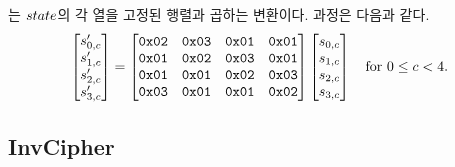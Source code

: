 \documentclass{article}
\begin{document}
\mc 는 $state$의 각 열을 고정된 행렬과 곱하는 변환이다. 과정은 다음과 같다.
$$
    \begin{bmatrix}
        s'_{0,c} \\
        s'_{1,c} \\
        s'_{2,c} \\
        s'_{3,c}
    \end{bmatrix}
     = \begin{bmatrix}
        \texttt{0x02} & \texttt{0x03} & \texttt{0x01} & \texttt{0x01} \\
        \texttt{0x01} & \texttt{0x02} & \texttt{0x03} & \texttt{0x01} \\
        \texttt{0x01} & \texttt{0x01} & \texttt{0x02} & \texttt{0x03} \\
        \texttt{0x03} & \texttt{0x01} & \texttt{0x01} & \texttt{0x02}
    \end{bmatrix} 
    \begin{bmatrix}
        s_{0,c} \\
        s_{1,c} \\
        s_{2,c} \\
        s_{3,c}
    \end{bmatrix} \quad \text{for } 0 \le c < 4.
$$

    




\subsection{InvCipher} 
\end{document}

